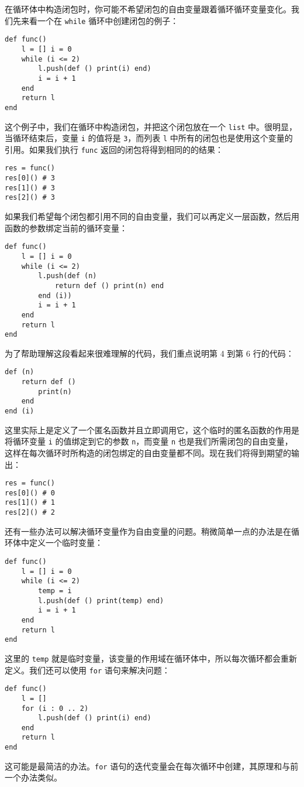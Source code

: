 在循环体中构造闭包时，你可能不希望闭包的自由变量跟着循环循环变量变化。我们先来看一个在 \texttt{while} 循环中创建闭包的例子：
\begin{lstlisting}[language=berry]
def func()
    l = [] i = 0
    while (i <= 2)
        l.push(def () print(i) end)
        i = i + 1
    end
    return l
end
\end{lstlisting}
这个例子中，我们在循环中构造闭包，并把这个闭包放在一个 \texttt{list} 中。很明显，当循环结束后，变量 \texttt{i} 的值将是 \texttt{3}，而列表 \texttt{l} 中所有的闭包也是使用这个变量的引用。如果我们执行 \texttt{func} 返回的闭包将得到相同的的结果：
\begin{lstlisting}[language=berry]
res = func()
res[0]() # 3
res[1]() # 3
res[2]() # 3
\end{lstlisting}
如果我们希望每个闭包都引用不同的自由变量，我们可以再定义一层函数，然后用函数的参数绑定当前的循环变量：
\begin{lstlisting}[language=berry]
def func()
    l = [] i = 0
    while (i <= 2)
        l.push(def (n)
            return def () print(n) end
        end (i))
        i = i + 1
    end
    return l
end
\end{lstlisting}
为了帮助理解这段看起来很难理解的代码，我们重点说明第 4 到第 6 行的代码：
\begin{lstlisting}[language=berry]
def (n)
    return def ()
        print(n)
    end
end (i)
\end{lstlisting}
这里实际上是定义了一个匿名函数并且立即调用它，这个临时的匿名函数的作用是将循环变量 \texttt{i} 的值绑定到它的参数 \texttt{n}，而变量 \texttt{n} 也是我们所需闭包的自由变量，这样在每次循环时所构造的闭包绑定的自由变量都不同。现在我们将得到期望的输出：
\begin{lstlisting}[language=berry]
res = func()
res[0]() # 0
res[1]() # 1
res[2]() # 2
\end{lstlisting}
还有一些办法可以解决循环变量作为自由变量的问题。稍微简单一点的办法是在循环体中定义一个临时变量：
\begin{lstlisting}[language=berry]
def func()
    l = [] i = 0
    while (i <= 2)
        temp = i
        l.push(def () print(temp) end)
        i = i + 1
    end
    return l
end
\end{lstlisting}
这里的 \texttt{temp} 就是临时变量，该变量的作用域在循环体中，所以每次循环都会重新定义。我们还可以使用 \texttt{for} 语句来解决问题：
\begin{lstlisting}[language=berry]
def func()
    l = []
    for (i : 0 .. 2)
        l.push(def () print(i) end)
    end
    return l
end
\end{lstlisting}
这可能是最简洁的办法。\texttt{for} 语句的迭代变量会在每次循环中创建，其原理和与前一个办法类似。


